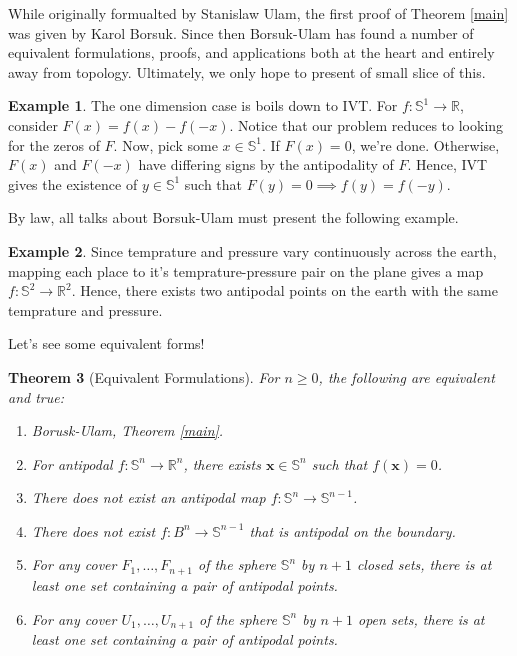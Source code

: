 \documentclass[12pt]{amsart}
\newtheorem{thm}{Theorem}[section]
\theoremstyle{definition}
\newtheorem{ex}[thm]{Example}
\begin{document}
    While originally formualted by Stanislaw Ulam, the first proof of Theorem \ref{main} was given by Karol Borsuk. Since then Borsuk-Ulam has found a number of equivalent formulations, proofs, and applications both at the heart and entirely away from topology. Ultimately, we only hope to present of small slice of this. 

    \begin{ex}
        The one dimension case is boils down to IVT. For $f: \mathbb S^1 \to \mathbb R$, consider $F(x) = f(x) - f(-x)$. Notice that our problem reduces to looking for the zeros of $F$. Now, pick some $x \in \mathbb S^1$. If $F(x) = 0$, we're done. Otherwise, $F(x)$ and $F(-x)$ have differing signs by the antipodality of $F$. Hence, IVT gives the existence of $y \in \mathbb S^1$ such that $F(y) = 0 \implies f(y) = f(-y)$. 
    \end{ex}

    By law, all talks about Borsuk-Ulam must present the following example.

    \begin{ex}
        Since temprature and pressure vary continuously across the earth, mapping each place to it's temprature-pressure pair on the plane gives a map $f: \mathbb S^2 \to \mathbb R^2$. Hence, there exists two antipodal points on the earth with the same temprature and pressure.
    \end{ex}

    Let's see some equivalent forms!

    \begin{thm}[Equivalent Formulations]
        \label{equiv}
        For $n \geq 0$, the following are equivalent and true:
        \begin{enumerate}
            \item Borusk-Ulam, Theorem \ref{main}.
            \item For antipodal $f: \mathbb S^n \to \mathbb R^n$, there exists $\mathbf x \in \mathbb S^n$ such that $f(\mathbf x) = 0$.
            \item There does not exist an antipodal map $f: \mathbb S^n \to \mathbb S^{n-1}$.
            \item There does not exist $f: B^n \to \mathbb S^{n-1}$ that is antipodal on the boundary.
            \item For any cover $F_1,\ldots,F_{n+1}$ of the sphere $\mathbb S^n$ by $n+1$ closed sets, there is at least one set containing a pair of antipodal points.
            \item For any cover $U_1,\ldots,U_{n+1}$ of the sphere $\mathbb S^n$ by $n+1$ open sets, there is at least one set containing a pair of antipodal points.
        \end{enumerate}
    \end{thm}
\end{document}
